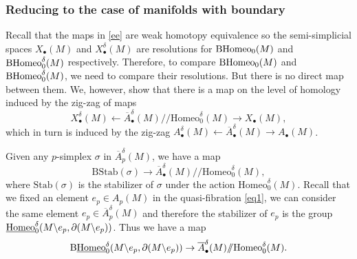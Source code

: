 \documentclass[a4paper]{amsart}
\theoremstyle{definition}
\theoremstyle{remark}
\newcommand{\hcoker}{/\!\!/}
\newcommand{\BH}{\mathrm{B}\text{\textnormal{Homeo}}}
\newcommand{\tdH}{\text{Homeo}^{\delta}}
\newcommand{\BdH}{\mathrm{B}\text{\textnormal{Homeo}}^{\delta}}
\newcommand{\BdwH}{\mathrm{B}\underline{\text{\textnormal{Homeo}}}^{\delta}}
\newcommand{\dwH}{\underline{\text{\textnormal{Homeo}}}^{\delta}}
\numberwithin{equation}{section}
\begin{document}
\subsubsection{Reducing  to the case of manifolds with boundary} Recall that the maps in \ref{ee} are weak homotopy equivalence so the semi-simplicial spaces $X_{\bullet}(M)$ and $X^{\delta}_{\bullet}(M)$ are resolutions for $\BH_0(M)$ and $\BdH_0(M)$ respectively. Therefore, to compare  $\BH_0(M)$ and $\BdH_0(M)$, we need to compare their resolutions. But there is no direct map between them. We, however, show that there is a map on the level of homology induced by  the zig-zag of maps
\begin{equation}\label{eq:4}
X_{\bullet}^{\delta}(M)\leftarrow \overline{A}^{\delta}_{\bullet}(M)\hcoker \tdH_0(M) \to X_{\bullet}(M),
\end{equation}
which in turn is induced by the zig-zag $A^{\delta}_{\bullet}(M)\leftarrow \overline{A}^{\delta}_{\bullet}(M)\to A_{\bullet}(M)$. 

Given any $p$-simplex $\sigma$ in $\overline{A}^{\delta}_{p}(M)$, we have a map
\[
\mathrm{BStab}(\sigma)\to \overline{A}^{\delta}_{\bullet}(M)\hcoker \tdH_0(M),
\]
where $\mathrm{Stab}(\sigma)$ is the stabilizer of $\sigma$ under the action $\tdH_0(M)$. Recall that we fixed an element $e_p\in A_p(M)$ in the quasi-fibration \ref{eq1}, we can consider the same element $e_p\in \overline{A}^{\delta}_{p}(M)$ and therefore the stabilizer of $e_p$ is the group $\dwH_{0}(M\backslash e_p,\partial(M\backslash e_p))$. Thus we have a map 
\[
\BdwH_0(M\backslash e_p,\partial(M\backslash e_p))\to  \overline{A}^{\delta}_{\bullet}(M)\hcoker \tdH_0(M).
\]
\end{document}
